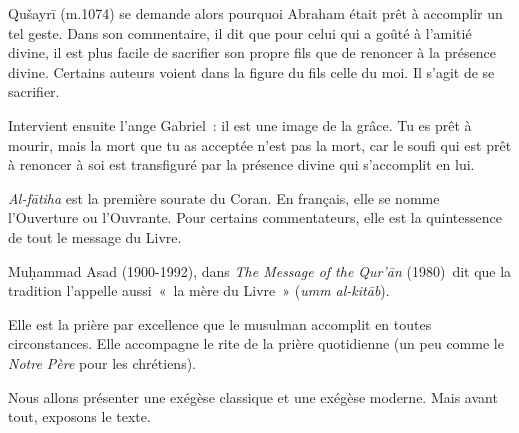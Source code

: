 Qušayrī (m.1074) se demande alors pourquoi Abraham était prêt à
accomplir un tel geste. Dans son commentaire, il dit que pour celui qui
a goûté à l'amitié divine, il est plus facile de sacrifier son propre
fils que de renoncer à la présence divine. Certains auteurs voient dans
la figure du fils celle du moi. Il s'agit de se sacrifier.

Intervient ensuite l'ange Gabriel~: il est une image de la grâce. Tu es
prêt à mourir, mais la mort que tu as acceptée n'est pas la mort, car le
soufi qui est prêt à renoncer à soi est transfiguré par la présence
divine qui s'accomplit en lui.

 
 


\emph{Al-fātiha} est la première sourate du Coran. En français, elle se
nomme l'Ouverture ou l'Ouvrante. Pour certains commentateurs, elle est
la quintessence de tout le message du Livre.

Muḥammad Asad (1900-1992), dans \emph{The Message of the Qur'ān}
(1980)~dit que la tradition l'appelle aussi~«~la mère du Livre~»
(\emph{umm al-kitāb}).

Elle est la prière par excellence que le musulman accomplit en toutes
circonstances. Elle accompagne le rite de la prière quotidienne (un peu
comme le \emph{Notre Père} pour les chrétiens).

Nous allons présenter une exégèse classique et une exégèse moderne. Mais
avant tout, exposons le texte.


